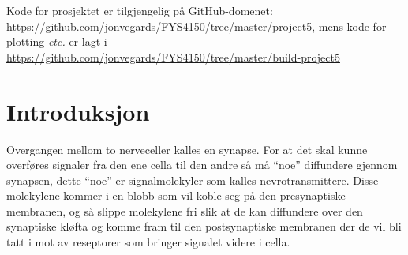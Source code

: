\documentclass[norsk, 10pt]{article}
\begin{document}


Kode for prosjektet er tilgjengelig  på GitHub-domenet: \url{https://github.com/jonvegards/FYS4150/tree/master/project5}, mens kode for plotting \emph{etc.} er lagt i \url{https://github.com/jonvegards/FYS4150/tree/master/build-project5}

\section*{Introduksjon}
Overgangen mellom to nerveceller kalles en synapse. For at det skal kunne overføres signaler fra den ene cella til den andre så må ``noe'' diffundere gjennom synapsen, dette ``noe'' er signalmolekyler som kalles nevrotransmittere. Disse molekylene kommer i en blobb som vil koble seg på den presynaptiske membranen,  og så slippe molekylene fri slik at de kan diffundere over den synaptiske kløfta og komme fram til den postsynaptiske membranen der de vil bli tatt i mot av reseptorer som bringer signalet videre i cella.
\end{document}
